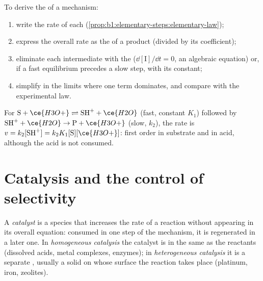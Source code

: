 \begin{method}\label{met:b1:elementary-steps:rate-law}
To derive the  of a mechanism:
\begin{enumerate}
  \item write the rate of each  (\cref{prop:b1:elementary-steps:elementary-law});
  \item express the overall rate as the  of a product
        (divided by its coefficient);
  \item eliminate each intermediate with the 
        ($\dd[\mathrm{I}]/\dd t = 0$, an algebraic equation) or, if a fast
        equilibrium precedes a slow step, with its constant;
  \item simplify in the limits where one term dominates, and compare
        with the experimental law.
\end{enumerate}
\end{method}

\begin{example}\label{ex:b1:elementary-steps:acid}
For $\mathrm{S} + \ce{H3O+} \rightleftharpoons \mathrm{SH}^+ + \ce{H2O}$ (fast,
constant $K_1$) followed by $\mathrm{SH}^+ + \ce{H2O} \to \mathrm{P} + \ce{H3O+}$ (slow,
$k_2$), the rate is $v = k_2[\mathrm{SH}^+] = k_2K_1[\mathrm{S}][\ce{H3O+}]$:
first order in substrate and in acid, although the acid is not consumed.
\end{example}

\section{Catalysis and the control of selectivity}

\begin{definition}\label{def:b1:elementary-steps:catalyst}
A \emph{catalyst} is a species that increases the rate of
a reaction without appearing in its overall equation: consumed in one
step of the mechanism, it is regenerated in a later one. In
\emph{homogeneous catalysis} the catalyst is
in the same  as the reactants (dissolved acids, metal complexes,
enzymes); in \emph{heterogeneous catalysis}
it is a separate , usually a solid on whose surface the
reaction takes place (platinum, iron, zeolites).
\end{definition}

